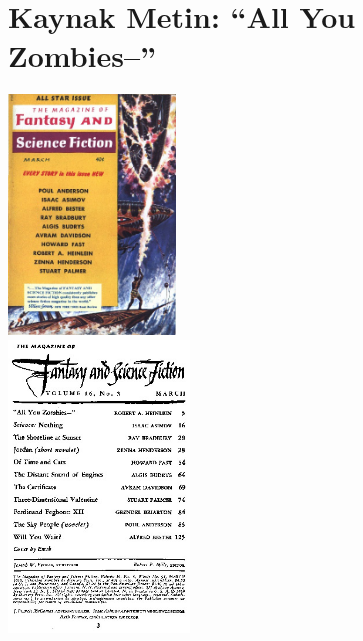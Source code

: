 
\chapter{Kaynak Metin: ``All You Zombies--''}

\begin{center}
  \shorthandoff{=}
  \includegraphics[width=12em,keepaspectratio]{scifi59}
  \shorthandon{=}
  \\
  \shorthandoff{=}
  \includegraphics[width=13em,keepaspectratio]{scifi59-index}
  \shorthandon{=}
\end{center}

\shorthandoff{=}

\shorthandon{=}

